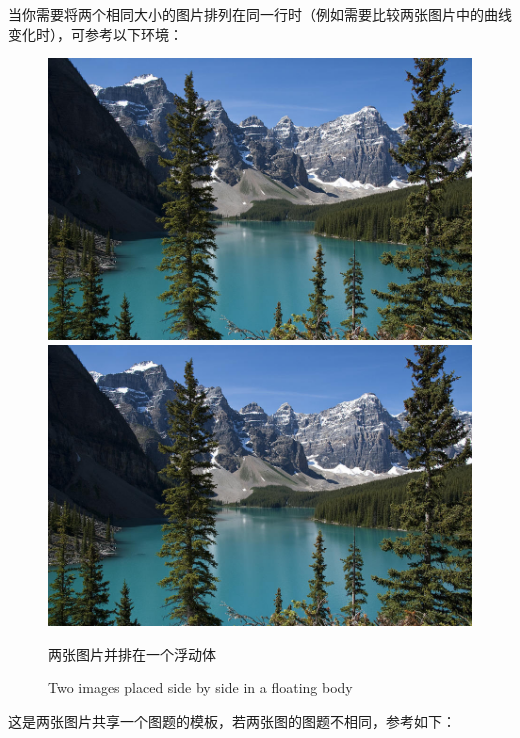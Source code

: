 \par 当你需要将两个相同大小的图片排列在同一行时（例如需要比较两张图片中的曲线变化时），可参考以下环境：
\begin{figure}
	\centering
	\includegraphics[scale=0.5]{./figures/Example.jpg}
	\hspace{1in}
	\includegraphics[scale=0.5]{./figures/Example.jpg}
	\caption{两张图片并排在一个浮动体}
	
	\addtocounter{figure}{-1}
	\vspace{-5pt}
	\renewcommand{\figurename}{Figure}
	\caption{Two images placed side by side in a floating body}
\end{figure}
\par 这是两张图片共享一个图题的模板，若两张图的图题不相同，参考如下：

